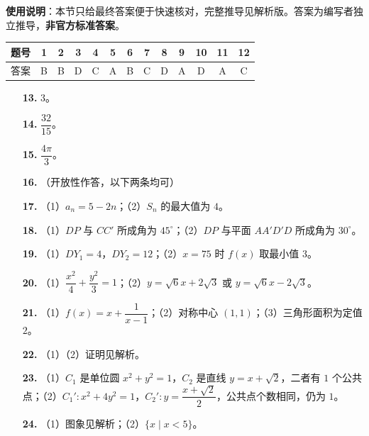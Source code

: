 
\begin{gknotice}
\textbf{使用说明}：本节只给最终答案便于快速核对，完整推导见解析版。答案为编写者独立推导，\textbf{非官方标准答案}。
\end{gknotice}

\begin{center}\begin{tabular}{ccccccccccccc}
\toprule
题号 & 1 & 2 & 3 & 4 & 5 & 6 & 7 & 8 & 9 & 10 & 11 & 12 \\
\midrule
答案 & B & B & D & C & A & B & C & D & A & D & A & C \\
\bottomrule
\end{tabular}\end{center}

\begin{itemize}[leftmargin=2.6em]
  \item[\textbf{13.}] $3$。
  \item[\textbf{14.}] $\dfrac{32}{15}$。
  \item[\textbf{15.}] $\dfrac{4\pi}3$。
  \item[\textbf{16.}] （开放性作答，以下两条均可）
\end{itemize}

\begin{itemize}[leftmargin=2.6em]
  \item[\textbf{17.}] （1）$a_n=5-2n$；（2）$S_n$ 的最大值为 $4$。
  \item[\textbf{18.}] （1）$DP$ 与 $CC'$ 所成角为 $45^\circ$；（2）$DP$ 与平面 $AA'D'D$ 所成角为 $30^\circ$。
  \item[\textbf{19.}] （1）$DY_1=4$，$DY_2=12$；（2）$x=75$ 时 $f(x)$ 取最小值 $3$。
  \item[\textbf{20.}] （1）$\dfrac{x^2}4+\dfrac{y^2}3=1$；（2）$y=\sqrt6x+2\sqrt3$ 或 $y=\sqrt6x-2\sqrt3$。
  \item[\textbf{21.}] （1）$f(x)=x+\dfrac1{x-1}$；（2）对称中心 $(1,1)$；（3）三角形面积为定值 $2$。
\end{itemize}

\begin{itemize}[leftmargin=2.6em]
  \item[\textbf{22.}] （1）（2）证明见解析。
  \item[\textbf{23.}] （1）$C_1$ 是单位圆 $x^2+y^2=1$，$C_2$ 是直线 $y=x+\sqrt2$，二者有 $1$ 个公共点；（2）$C_1':x^2+4y^2=1$，$C_2':y=\dfrac{x+\sqrt2}2$，公共点个数相同，仍为 $1$。
  \item[\textbf{24.}] （1）图象见解析；（2）$\{x\mid x<5\}$。
\end{itemize}
